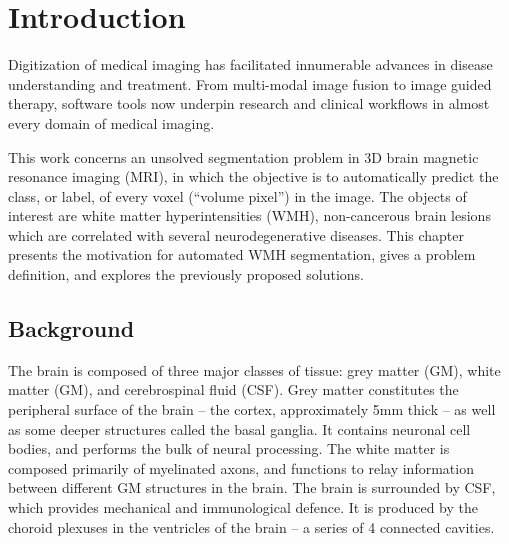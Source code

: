 \chapter{Introduction}
Digitization of medical imaging has facilitated innumerable advances in disease understanding and treatment. From multi-modal image fusion to image guided therapy, software tools now underpin research and clinical workflows in almost every domain of medical imaging.
\par
This work concerns an unsolved segmentation problem in 3D brain magnetic resonance imaging (MRI), in which the objective is to automatically predict the class, or label, of every voxel (``volume pixel'') in the image. The objects of interest are white matter hyperintensities (WMH), non-cancerous brain lesions which are correlated with several neurodegenerative diseases. This chapter presents the motivation for automated WMH segmentation, gives a problem definition, and explores the previously proposed solutions.
\section{Background}
The brain is composed of three major classes of tissue: grey matter (GM), white matter (GM), and cerebrospinal fluid (CSF). Grey matter constitutes the peripheral surface of the brain -- the cortex, approximately 5mm thick -- as well as some deeper structures called the basal ganglia. It contains neuronal cell bodies, and performs the bulk of neural processing. The white matter is composed primarily of myelinated axons, and functions to relay information between different GM structures in the brain. The brain is surrounded by CSF, which provides mechanical and immunological defence. It is produced by the choroid plexuses in the ventricles of the brain -- a series of 4 connected cavities.
